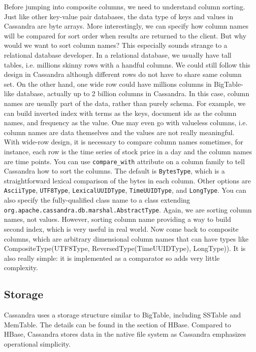 \documentclass[12pt]{book}
\begin{document}
Before jumping into composite columns, we need to understand column sorting. Just like other key-value pair databases, the data type of keys and values in Cassandra are byte arrays. More interestingly, we can specify how column names will be compared for sort order when results are returned to the client. But why would we want to sort column names? This especially sounds strange to a relational database developer. In a relational database, we usually have tall tables, i.e. millions skinny rows with a handful columns. We could still follow this design in Cassandra although different rows do not have to share same column set. On the other hand, one wide row could have millions columns in BigTable-like database, actually up to 2 billion columns in Cassandra. In this case, column names are usually part of the data, rather than purely schema. For example, we can build inverted index with terms as the keys, document ids as the column names, and frequency as the value. One may even go with valueless columns, i.e. column names are data themselves and the values are not really meaningful. With wide-row design, it is necessary to compare column names sometimes, for instance, each row is the time series of stock price in a day and the column names are time points. You can use \texttt{compare\_with} attribute on a column family to tell Cassandra how to sort the columns. The default is \texttt{BytesType}, which is a straightforward lexical comparison of the bytes in each column. Other options are \texttt{AsciiType}, \texttt{UTF8Type}, \texttt{LexicalUUIDType}, \texttt{TimeUUIDType}, and \texttt{LongType}. You can also specify the fully-qualified class name to a class extending \texttt{org.apache.cassandra.db.marshal.AbstractType}. Again, we are sorting column names, not values. However, sorting column name providing a way to build second index, which is very useful in real world. Now come back to composite columns, which are arbitrary dimensional column names that can have types like CompositeType(UTF8Type, ReversedType(TimeUUIDType), LongType)). It is also really simple: it is implemented as a comparator so adds very little complexity.

\subsection{Storage}

Cassandra uses a storage structure similar to BigTable, including SSTable and MemTable. The details can be found in the section of HBase. Compared to HBase, Cassandra stores data in the native file system as Cassandra emphasizes operational simplicity.
\end{document}
